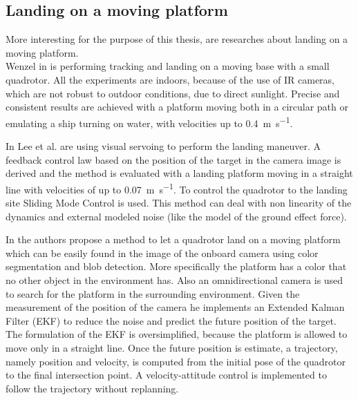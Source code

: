 \subsection{Landing on a moving platform}

More interesting for the purpose of this thesis, are researches about landing on a moving platform.\\

Wenzel in \cite{wenzel2011automatic} is performing tracking and landing on a moving base with a small quadrotor. All the experiments are indoors, because of the use of IR cameras, which are not robust to outdoor conditions, due to direct sunlight. Precise and consistent results are achieved with a platform moving both in a circular path or emulating a ship turning on water, with velocities up to \SI{0.4}{\meter \per \second}.

In \cite{lee2012autonomous} Lee et al. are using visual servoing to perform the landing maneuver. A feedback control law based on the position of the target in the camera image is derived and the method is evaluated with a landing platform moving in a straight line with velocities of up to \SI{0.07}{\meter \per \second}.
To control the quadrotor to the landing site Sliding Mode Control is used. This method can deal with non linearity of the dynamics and external modeled noise (like the model of the ground effect force). 

In \cite{Kim2016} the authors propose a method to let a quadrotor land on a moving platform which can be easily found in the image of the onboard camera using color segmentation and blob detection. More specifically the platform has a color that no other object in the environment has. Also an omnidirectional camera is used  to search for the platform in the surrounding environment. Given the measurement of the position of the camera he implements an Extended Kalman Filter (EKF) to reduce the noise and predict the future position of the target. The formulation of the EKF is oversimplified, because the platform is allowed to move only in a straight line. Once the future position is estimate, a trajectory, namely position and velocity, is computed from the initial pose of the quadrotor to the final intersection point. A velocity-attitude control is implemented to follow the trajectory without replanning.

